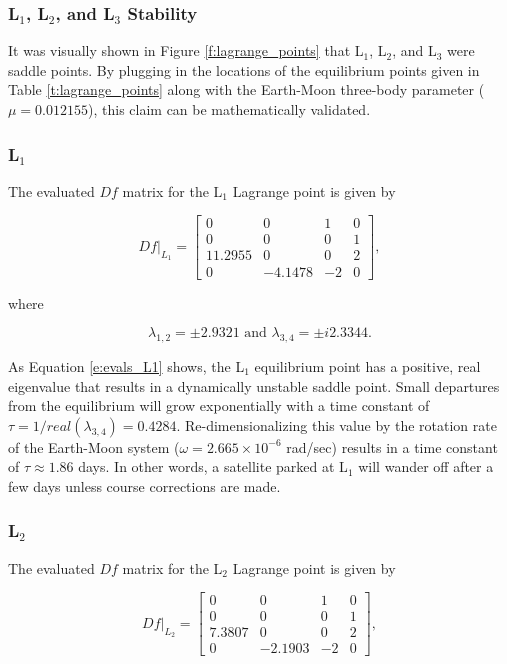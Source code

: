 \documentclass[11pt]{article} %
\begin{document}
\subsubsection{L$_1$, L$_2$, and L$_3$ Stability}
It was visually shown in Figure \ref{f:lagrange_points} that L$_1$, L$_2$, and L$_3$ were saddle points. By plugging in the locations of the equilibrium points given in Table \ref{t:lagrange_points} along with the Earth-Moon three-body parameter ($\mu = 0.012155$), this claim can be mathematically validated. 

\subsubsection*{L$_1$}
The evaluated $Df$ matrix for the L$_1$ Lagrange point is given by

\doublespacing
\begin{equation}
	\label{e:df_eval_L1}
	Df|_{L_1} = 
	\begin{bmatrix} 
		0 & 0 & 1  & 0 \\ 
		0 & 0 & 0 & 1 \\
		11.2955 & 0 & 0 & 2 \\
		0 & -4.1478 & -2 & 0
	\end{bmatrix},
\end{equation}
\singlespacing

\noindent
where

\begin{equation}
	\label{e:evals_L1}
	\lambda_{1,2} = \pm 2.9321 \text{ and } \lambda_{3,4} = \pm i2.3344.
\end{equation}

\noindent
As Equation \ref{e:evals_L1} shows, the L$_1$ equilibrium point has a positive, real eigenvalue that results in a dynamically unstable saddle point. Small departures from the equilibrium will grow exponentially with a time constant of $\tau = 1/real(\lambda_{3,4}) = 0.4284$. Re-dimensionalizing this value by the rotation rate of the Earth-Moon system ($\omega=2.665\times10^{-6}$ rad/sec) results in a time constant of $\tau\approx1.86$ days. In other words, a satellite parked at L$_1$ will wander off after a few days unless course corrections are made.

\subsubsection*{L$_2$}
The evaluated $Df$ matrix for the L$_2$ Lagrange point is given by

\doublespacing
\begin{equation}
	\label{e:df_eval_L2}
	Df|_{L_2} = 
	\begin{bmatrix} 
		0 & 0 & 1  & 0 \\ 
		0 & 0 & 0 & 1 \\
		7.3807 & 0 & 0 & 2 \\
		0 & -2.1903 & -2 & 0
	\end{bmatrix},
\end{equation}
\singlespacing
\end{document}
